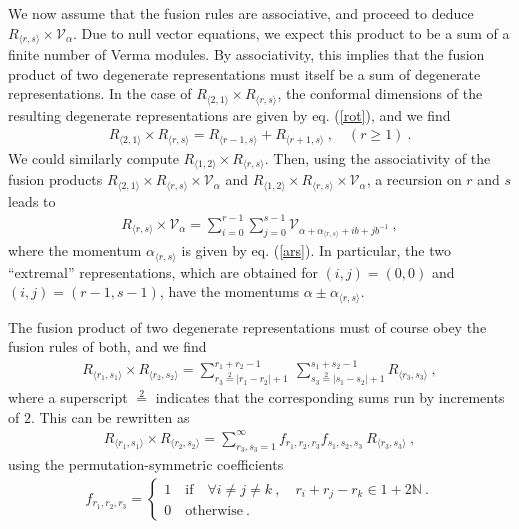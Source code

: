 \documentclass[12pt,a4paper,notitlepage]{report}
\newcommand \bla {\left\{\begin{array}{l} }
\newcommand \ela {\end{array}\right. }
\newcommand \N {\mathbb{N}}
\numberwithin{equation}{section}
\theoremstyle{break}
\begin{document}
We now assume that the fusion rules are associative, and proceed to deduce $R_{\langle r,s \rangle}\times \mathcal{V}_\alpha$. Due to null vector equations, we expect this product to be a sum of a finite number of Verma modules. By associativity, this implies that the fusion product of two degenerate representations must itself be a sum of degenerate representations. In the case of  
$R_{\langle 2,1\rangle}\times R_{\langle r,s\rangle}$, the conformal dimensions of the resulting degenerate representations are given by eq. (\ref{rot}), and we find
\begin{align}
R_{\langle 2,1\rangle}\times R_{\langle r,s\rangle} = R_{\langle r-1,s\rangle} + R_{\langle r+1,s\rangle }\ , \quad (r\geq 1)\ .
\end{align}
We could similarly compute $R_{\langle 1,2\rangle}\times R_{\langle r,s\rangle}$. Then, using the associativity of the fusion products $R_{\langle 2,1\rangle}\times R_{\langle r,s\rangle}\times \mathcal{V}_\alpha$ and $R_{\langle 1,2\rangle}\times R_{\langle r,s\rangle}\times \mathcal{V}_\alpha$, a recursion on $r$ and $s$ leads to
\begin{align}
 \boxed{R_{\langle r,s \rangle}\times \mathcal{V}_\alpha = \sum_{i=0}^{r-1} \sum_{j=0}^{s-1} \mathcal{V}_{\alpha + \alpha_{\langle r,s \rangle}+ ib+jb^{-1}}}\ ,
\label{rtv}
\end{align}
where the momentum $\alpha_{\langle r,s \rangle}$ is given by eq. (\ref{ars}). 
In particular, the two ``extremal'' representations, which are obtained for $(i,j)=(0,0)$ and $(i,j)=(r-1,s-1)$, have the momentums
$\alpha \pm \alpha_{\langle r,s \rangle} $.

The fusion product of two degenerate representations must of course obey the fusion rules of both, and we find
\begin{align}
 \boxed{R_{\langle r_1,s_1 \rangle} \times R_{\langle r_2,s_2 \rangle} = \sum_{r_3\overset{2}{=}|r_1-r_2|+1}^{r_1+r_2-1}\ \sum_{s_3\overset{2}{=}|s_1-s_2|+1}^{s_1+s_2-1} R_{\langle r_3,s_3 \rangle}}\ ,
\label{rrsr}
\end{align}
where a superscript $\overset{2}{=}$ indicates that the corresponding sums run by increments of $2$. This can be rewritten as 
\begin{align}
R_{\langle r_1,s_1 \rangle} \times R_{\langle r_2,s_2 \rangle} = \sum_{r_3,s_3=1}^\infty f_{r_1,r_2,r_3} f_{s_1,s_2,s_3}\ R_{\langle r_3,s_3 \rangle}\ ,
 \label{rrrsss}
\end{align}
using the permutation-symmetric coefficients
\begin{align}
f_{r_1,r_2,r_3} = \bla 1 \quad \text{if} \quad 
 \forall i\neq j\neq k \ , \quad r_i+r_j-r_k \in 1 + 2\N\ .
\\ 0 \quad \text{otherwise} \ .\ela 
\label{frrr}
\end{align}
\end{document}
